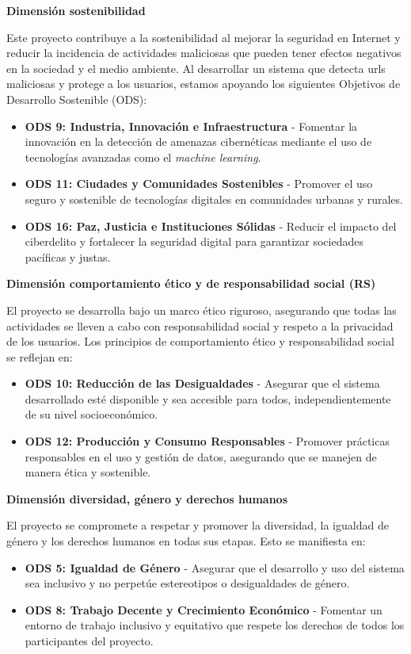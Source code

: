 \textbf{Dimensión sostenibilidad}

\medskip
\hspace{1em}Este proyecto contribuye a la sostenibilidad al mejorar la seguridad en Internet y reducir la incidencia de actividades maliciosas que pueden tener efectos negativos en la sociedad y el medio ambiente. Al desarrollar un sistema que detecta \glspl{url} maliciosas y protege a los usuarios, estamos apoyando los siguientes Objetivos de Desarrollo Sostenible (ODS):


\begin{itemize}
    \item \textbf{ODS 9: Industria, Innovación e Infraestructura} - Fomentar la innovación en la detección de amenazas cibernéticas mediante el uso de tecnologías avanzadas como el \textit{machine learning}.
    \item \textbf{ODS 11: Ciudades y Comunidades Sostenibles} - Promover el uso seguro y sostenible de tecnologías digitales en comunidades urbanas y rurales.
    \item \textbf{ODS 16: Paz, Justicia e Instituciones Sólidas} - Reducir el impacto del ciberdelito y fortalecer la seguridad digital para garantizar sociedades pacíficas y justas.
\end{itemize}

\textbf{{Dimensión comportamiento ético y de responsabilidad social (RS)}
}\medskip

\hspace{1em}El proyecto se desarrolla bajo un marco ético riguroso, asegurando que todas las actividades se lleven a cabo con responsabilidad social y respeto a la privacidad de los usuarios. Los principios de comportamiento ético y responsabilidad social se reflejan en:

\begin{itemize}
    \item \textbf{ODS 10: Reducción de las Desigualdades} - Asegurar que el sistema desarrollado esté disponible y sea accesible para todos, independientemente de su nivel socioeconómico.
    \item \textbf{ODS 12: Producción y Consumo Responsables} - Promover prácticas responsables en el uso y gestión de datos, asegurando que se manejen de manera ética y sostenible.
\end{itemize}

\textbf{{Dimensión diversidad, género y derechos humanos}
}\medskip

\hspace{1em}El proyecto se compromete a respetar y promover la diversidad, la igualdad de género y los derechos humanos en todas sus etapas. Esto se manifiesta en:

\begin{itemize}
    \item \textbf{ODS 5: Igualdad de Género} - Asegurar que el desarrollo y uso del sistema sea inclusivo y no perpetúe estereotipos o desigualdades de género.
    \item \textbf{ODS 8: Trabajo Decente y Crecimiento Económico} - Fomentar un entorno de trabajo inclusivo y equitativo que respete los derechos de todos los participantes del proyecto.
\end{itemize}
